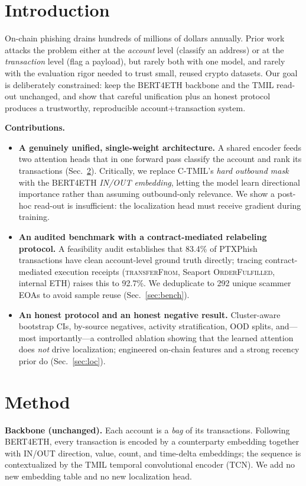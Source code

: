 \documentclass[conference]{IEEEtran}
\begin{document}
\section{Introduction}
On-chain phishing drains hundreds of millions of dollars annually. Prior work
attacks the problem either at the \emph{account} level (classify an address) or at
the \emph{transaction} level (flag a payload), but rarely both with one model, and
rarely with the evaluation rigor needed to trust small, reused crypto datasets.
Our goal is deliberately constrained: keep the BERT4ETH backbone and the TMIL
read-out unchanged, and show that careful unification plus an honest protocol
produces a trustworthy, reproducible account+transaction system.

\noindent\textbf{Contributions.}
\begin{itemize}
\item \textbf{A genuinely unified, single-weight architecture.} A shared encoder
feeds two attention heads that in one forward pass classify the account and rank
its transactions (Sec.~\ref{sec:method}). Critically, we replace C-TMIL's
\emph{hard outbound mask} with the BERT4ETH \emph{IN/OUT embedding}, letting the
model learn directional importance rather than assuming outbound-only relevance.
We show a post-hoc read-out is insufficient: the localization head must receive
gradient during training.
\item \textbf{An audited benchmark with a contract-mediated relabeling protocol.}
A feasibility audit establishes that 83.4\% of PTXPhish transactions have clean
account-level ground truth directly; tracing contract-mediated execution receipts
(\textsc{transferFrom}, Seaport \textsc{OrderFulfilled}, internal ETH) raises this
to 92.7\%. We deduplicate to 292 unique scammer EOAs to avoid sample reuse
(Sec.~\ref{sec:bench}).
\item \textbf{An honest protocol and an honest negative result.} Cluster-aware
bootstrap CIs, by-source negatives, activity stratification, OOD splits, and---most
importantly---a controlled ablation showing that the learned attention does
\emph{not} drive localization; engineered on-chain features and a strong recency
prior do (Sec.~\ref{sec:loc}).
\end{itemize}

\section{Method}\label{sec:method}
\textbf{Backbone (unchanged).} Each account is a \emph{bag} of its transactions.
Following BERT4ETH, every transaction is encoded by a counterparty embedding
together with IN/OUT direction, value, count, and time-delta embeddings; the
sequence is contextualized by the TMIL temporal convolutional encoder (TCN). We
add no new embedding table and no new localization head.
\end{document}
